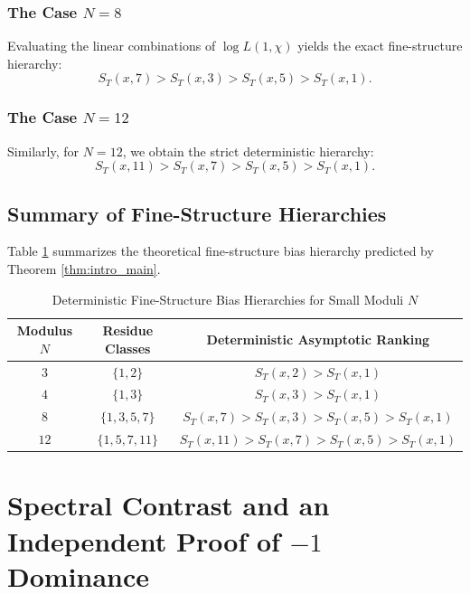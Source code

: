 \documentclass[12pt,reqno]{amsart}
\theoremstyle{definition}
\theoremstyle{remark}
\numberwithin{equation}{section}
\begin{document}
\subsubsection{The Case $N = 8$}
Evaluating the linear combinations of $\log L(1, \chi)$ yields the exact fine-structure hierarchy:
\begin{equation}
S_T(x, 7) > S_T(x, 3) > S_T(x, 5) > S_T(x, 1).
\end{equation}

\subsubsection{The Case $N = 12$}
Similarly, for $N=12$, we obtain the strict deterministic hierarchy:
\begin{equation}
S_T(x, 11) > S_T(x, 7) > S_T(x, 5) > S_T(x, 1).
\end{equation}

\subsection{Summary of Fine-Structure Hierarchies}

Table \ref{tab:bias_summary} summarizes the theoretical fine-structure bias hierarchy predicted by Theorem \ref{thm:intro_main}.

\begin{table}[h!]
\centering
\caption{Deterministic Fine-Structure Bias Hierarchies for Small Moduli $N$}
\label{tab:bias_summary}
\begin{tabular}{ccc}
\toprule
Modulus $N$ & Residue Classes & Deterministic Asymptotic Ranking \\ \midrule
$3$ & $\{1, 2\}$ & $S_T(x, 2) > S_T(x, 1)$ \\
$4$ & $\{1, 3\}$ & $S_T(x, 3) > S_T(x, 1)$ \\
$8$ & $\{1, 3, 5, 7\}$ & $S_T(x, 7) > S_T(x, 3) > S_T(x, 5) > S_T(x, 1)$ \\
$12$ & $\{1, 5, 7, 11\}$ & $S_T(x, 11) > S_T(x, 7) > S_T(x, 5) > S_T(x, 1)$ \\ \bottomrule
\end{tabular}
\end{table}

\section{Spectral Contrast and an Independent Proof of $-1$ Dominance}
\label{sec:spectral_contrast}
\end{document}
